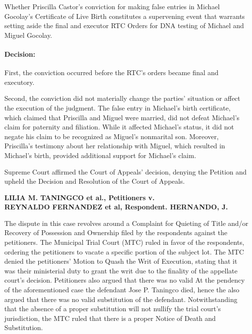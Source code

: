\documentclass[
12pt,
oneside,
onehalfspacing,
headsepline
]{DigestCollection}
\begin{document}
Whether Priscilla Castor's conviction for making false entries in Michael Gocolay's Certificate of Live Birth constitutes a supervening event that warrants setting aside the final and executor RTC Orders for DNA testing of Michael and Miguel Gocolay.

\paragraph{Decision:}
\label{080a2260-1245-11ef-aa24-9916ea601717}


First, the conviction occurred before the RTC's orders became final and executory. 

Second, the conviction did not materially change the parties' situation or affect the execution of the judgment. The false entry in Michael's birth certificate, which claimed that Priscilla and Miguel were married, did not defeat Michael's claim for paternity and filiation. While it affected Michael's status, it did not negate his claim to be recognized as Miguel's nonmarital son. Moreover, Priscilla's testimony about her relationship with Miguel, which resulted in Michael's birth, provided additional support for Michael's claim.

Supreme Court affirmed the Court of Appeals' decision, denying the Petition and upheld the Decision and Resolution of the Court of Appeals.

\label{38b57480-0a1d-11ef-932c-63c852f65e48}


\noindent\textbf{LILIA M. TANINGCO et al., Petitioners v. \\REYNALDO FERNANDEZ et al, Respondent. HERNANDO, J.}\vspace{0.4cm}

The dispute in this case revolves around a Complaint for Quieting of Title and/or Recovery of Possession and Ownership filed by the respondents against the petitioners. The Municipal Trial Court (MTC) ruled in favor of the respondents, ordering the petitioners to vacate a specific portion of the subject lot. The MTC denied the petitioners' Motion to Quash the Writ of Execution, stating that it was their ministerial duty to grant the writ due to the finality of the appellate court's decision. Petitioners also argued that there was no valid At the pendency of the aforementioned case the defendant Jose P. Taningco died, hence the also argued that there was no valid substitution of the defendant. Notwithstanding that the absence of a proper substitution will not nullify the trial court's jurisdiction, the MTC ruled that there is a proper Notice of Death and Substitution.
\end{document}
